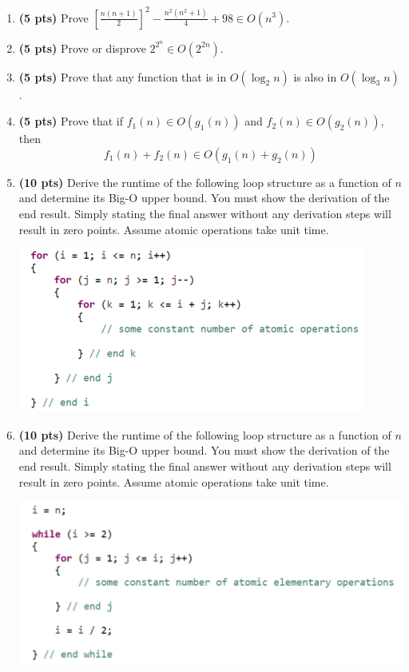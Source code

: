 \documentclass[12pt]{article}
\begin{document}
\begin{enumerate}
\item
  \textbf{(5 pts)} Prove $\left[\frac{n(n+1)}{2}\right]^2-\frac{n^2(n^2+1)}{4}+98\in O(n^3)$.

\item
  \textbf{(5 pts)} Prove or disprove $2^{2^n} \in O(2^{2n})$. 

\item \label{prob:courses}
  \textbf{(5 pts)} Prove that any function that is in $O(\log_2n)$ is also in $O(\log_3n)$.

\item \textbf{(5 pts)} Prove that if $f_1(n) \in O(g_1(n))$ and $f_2(n) \in O(g_2(n))$, then
    \boldmath
    \begin{equation*}
        f_1(n) + f_2(n) \in O(g_1(n) + g_2(n))
    \end{equation*}
    \unboldmath

\item \textbf{(10 pts)} Derive the runtime of the following loop structure as a function of $n$ and determine its Big-O upper bound. You must show the derivation of the end result. Simply stating the final answer without any derivation steps will result in zero points. Assume atomic operations take unit time.
\begin{center}
    \includegraphics[scale=1.4]{hw1_pic1.png}
\end{center}

\item \textbf{(10 pts)}
  Derive the runtime of the following loop structure as a function of $n$ and determine its Big-O upper bound. You must show the derivation of the end result. Simply stating the final answer without any derivation steps will result in zero points. Assume atomic operations take unit time.
  \begin{center}
    \includegraphics[scale=1.3]{hw1_pic2.png}
  \end{center}

\end{enumerate}
\end{document}
